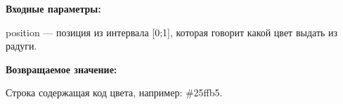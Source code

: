 \textbf{Входные параметры:}

position --- позиция из интервала [0;1], которая говорит какой цвет выдать из радуги.

\textbf{Возвращаемое значение:}

Строка содержащая код цвета, например: \#25ffb5.